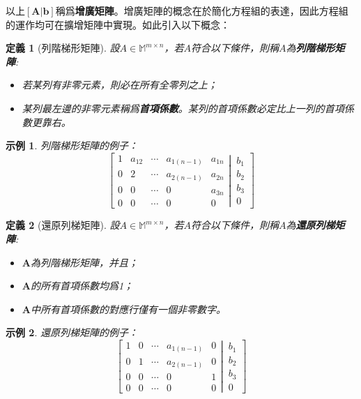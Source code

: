 \documentclass[12pt]{article}
\newtheorem{definition}{定義}
\newtheorem*{example}{示例}
\begin{document}
    以上$[\mathbf{A}|\mathbf{b}]$稱爲\textbf{增廣矩陣}。增廣矩陣的概念在於簡化方程組的表達，因此方程組的運作均可在擴增矩陣中實現。如此引入以下概念：

    \begin{definition}[列階梯形矩陣]
        設$A\in\mathbb{M}^{m\times n}$，若$A$符合以下條件，則稱$A$為\textbf{列階梯形矩陣}:\begin{itemize}
            \item 若某列有非零元素，則必在所有全零列之上；
            \item 某列最左邊的非零元素稱爲\textbf{首項係數}。某列的首項係數必定比上一列的首項係數更靠右。
        \end{itemize}
    \end{definition}

    \begin{example}
        列階梯形矩陣的例子：
        $$\left[
        \begin{matrix}
            1&a_{12}&\cdots&a_{1(n-1)}&a_{1n}\\
            0&2&\cdots&a_{2(n-1)}&a_{2n}\\
            0&0&\cdots&0&a_{3n}\\
            0&0&\cdots&0&0
        \end{matrix}
        \left|
          \,
          \begin{matrix}
            b_1\\b_2\\b_3\\0
          \end{matrix}
        \right.
      \right]$$
    \end{example}

    \begin{definition}[還原列梯矩陣]
        設$A\in\mathbb{M}^{m\times n}$，若$A$符合以下條件，則稱$A$為\textbf{還原列梯矩陣}:\begin{itemize}
            \item $\mathbf{A}$為列階梯形矩陣，并且；
            \item $\mathbf{A}$的所有首項係數均爲1；
            \item $\mathbf{A}$中所有首項係數的對應行僅有一個非零數字。
        \end{itemize}
    \end{definition}

    \begin{example}
        還原列梯矩陣的例子：
        $$\left[
        \begin{matrix}
            1&0&\cdots&a_{1(n-1)}&0\\
            0&1&\cdots&a_{2(n-1)}&0\\
            0&0&\cdots&0&1\\
            0&0&\cdots&0&0
        \end{matrix}
        \left|
          \,
          \begin{matrix}
            b_1\\b_2\\b_3\\0
          \end{matrix}
        \right.
      \right]$$
    \end{example}
\end{document}
